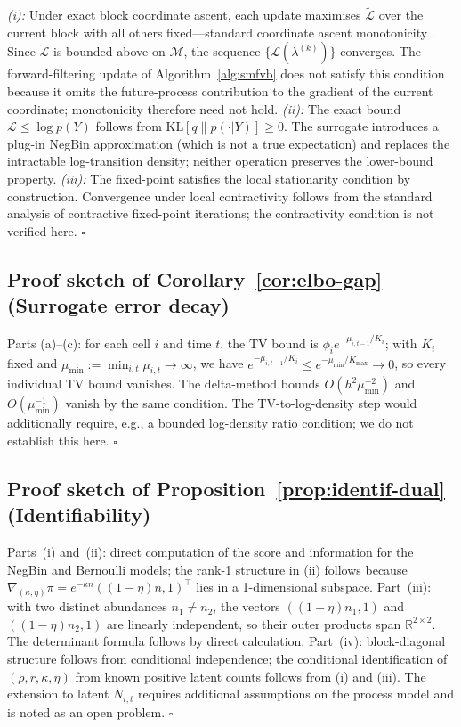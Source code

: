 \documentclass[review,12pt]{elsarticle}
\theoremstyle{definition}
\begin{document}
\textit{(i):} Under exact block coordinate ascent, each update maximises
$\tilde{\mathcal{L}}$ over the current block with all others fixed---standard
coordinate ascent monotonicity \citep{blei2017}.  Since $\tilde{\mathcal{L}}$
is bounded above on $\mathcal{M}$, the sequence $\{\tilde{\mathcal{L}}(\lambda^{(k)})\}$
converges.  The forward-filtering update of Algorithm~\ref{alg:smfvb} does not
satisfy this condition because it omits the future-process contribution to the
gradient of the current coordinate; monotonicity therefore need not hold.
\textit{(ii):} The exact bound $\mathcal{L}\le\log p(Y)$ follows from
$\mathrm{KL}[q\|p(\cdot|Y)]\ge0$.  The surrogate introduces
a plug-in NegBin approximation (which is not a true expectation) and replaces
the intractable log-transition density; neither operation preserves the
lower-bound property.
\textit{(iii):} The fixed-point satisfies the local stationarity condition by
construction.  Convergence under local contractivity follows from the standard
analysis of contractive fixed-point iterations; the contractivity condition is
not verified here.
\hfill$\square$

\subsection*{Proof sketch of Corollary~\ref{cor:elbo-gap} (Surrogate error decay)}

Parts (a)--(c): for each cell $i$ and time $t$, the TV bound is
$\phi_i e^{-\mu_{i,t-1}/K_i}$; with $K_i$ fixed and $\mu_{\min}:=\min_{i,t}\mu_{i,t}\to\infty$,
we have $e^{-\mu_{i,t-1}/K_i}\le e^{-\mu_{\min}/K_{\max}}\to0$, so every
individual TV bound vanishes.  The delta-method bounds
$O(h^2\mu_{\min}^{-2})$ and $O(\mu_{\min}^{-1})$ vanish by the same condition.
The TV-to-log-density step would additionally require, e.g., a bounded
log-density ratio condition; we do not establish this here.
\hfill$\square$

\subsection*{Proof sketch of Proposition~\ref{prop:identif-dual} (Identifiability)}

Parts~(i) and~(ii): direct computation of the score and information for the
NegBin and Bernoulli models; the rank-1 structure in (ii) follows because
$\nabla_{(\kappa,\eta)}\pi = e^{-\kappa n}((1-\eta)n,1)^\top$ lies in a
1-dimensional subspace.
Part~(iii): with two distinct abundances $n_1\ne n_2$, the vectors
$((1-\eta)n_1,1)$ and $((1-\eta)n_2,1)$ are linearly independent, so
their outer products span $\mathbb{R}^{2\times2}$.
The determinant formula follows by direct calculation.
Part~(iv): block-diagonal structure follows from conditional independence;
the conditional identification of $(\rho,r,\kappa,\eta)$ from known positive
latent counts follows from (i) and (iii).  The extension to latent $N_{i,t}$
requires additional assumptions on the process model and is noted as an open problem.
\hfill$\square$
\end{document}

